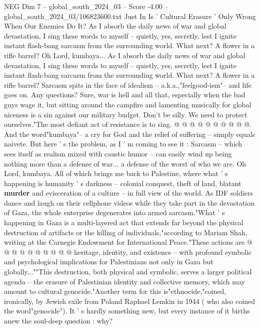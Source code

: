 \begin{textsample}{NEG Dim 7 – global\_south\_2024\_03 – Score -4.00 – global\_south\_2024\_03/106823600.txt}  \label{ex:f7_neg_425}
Just In Is ' Cultural Erasure ' Only Wrong When Our Enemies Do It?
As I absorb the daily news of war and global devastation, I sing these words to myself -- quietly, yes, secretly, lest I ignite instant flash-bang sarcasm from the surrounding world.
What next?
A flower in a rifle barrel?
Oh Lord, kumbaya...
As I absorb the daily news of war and global devastation, I sing these words to myself -- quietly, yes, secretly, lest I ignite instant flash-bang sarcasm from the surrounding world.
What next?
A flower in a rifle barrel?
Sarcasm spits in the face of idealism -- a.k.a.,"feelgood-ism"-- and life goes on.
Any questions?
Sure, war is hell and all that, especially when the bad guys wage it, but sitting around the campfire and lamenting musically for global niceness is a sin against our military budget.
Don't be silly.
We need to protect ourselves."The most defiant act of resistance is to sing. @ @ @ @ @ @ @ @ @ @.
And the word"kumbaya"-- a cry for God and the relief of suffering -- simply equals naivete.
But here ' s the problem, as I ' m coming to see it : Sarcasm -- which sees itself as realism mixed with caustic humor -- can easily wind up being nothing more than a defense of war... a defense of the worst of who we are.
Oh Lord, kumbaya.
All of which brings me back to Palestine, where what ' s happening is humanity ' s darkness -- colonial conquest, theft of land, blatant \textbf{murder} and evisceration of a culture -- in full view of the world.
As IDF soldiers dance and laugh on their cellphone videos while they take part in the devastation of Gaza, the whole enterprise degenerates into armed sarcasm."What ' s happening in Gaza is a multi-layered act that extends far beyond the physical destruction of artifacts or the killing of individuals,"according to Mariam Shah, writing at the Carnegie Endowment for International Peace."These actions are @ @ @ @ @ @ @ @ @ @ heritage, identity, and existence -- with profound symbolic and psychological implications for Palestinians not only in Gaza but globally...""This destruction, both physical and symbolic, serves a larger political agenda -- the erasure of Palestinian identity and collective memory, which may amount to cultural genocide."Another term for this is"ethnocide,"coined, ironically, by Jewish exile from Poland Raphael Lemkin in 1944 ( who also coined the word"genocide").
It ' s hardly something new, but every instance of it births anew the soul-deep question : why?

\end{textsample}
